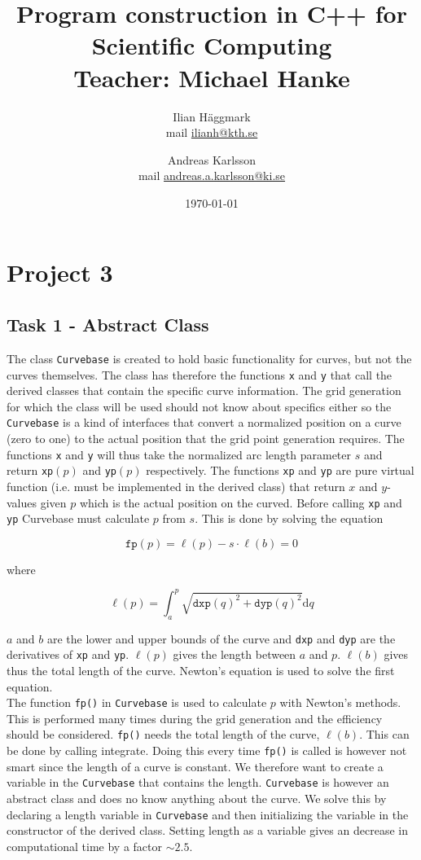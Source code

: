 \documentclass[paper=a4, fontsize=12pt]{article} %
\title{Program construction in C++ for Scientific Computing \\ Teacher: Michael Hanke}
\author{Ilian H{\"a}ggmark \\ mail \href{mailto:ilianh@kth.se}{ilianh@kth.se}
  \and Andreas Karlsson \\ mail \href{mailto:andreas.a.karlsson@ki.se}{andreas.a.karlsson@ki.se} }
\date{\normalsize\today} %
\begin{document}
\maketitle %

\section*{Project 3}
\subsection*{Task 1 - Abstract Class}

The class \texttt{Curvebase} is created to hold basic functionality for curves, but not the curves themselves. The class has therefore the functions \texttt{x} and \texttt{y} that call the derived classes that contain the specific curve information. The grid generation for which the class will be used should not know about specifics either so the \texttt{Curvebase} is a kind of interfaces that convert a normalized position on a curve (zero to one) to the actual position that the grid point generation requires. The functions \texttt{x} and \texttt{y} will thus take the normalized arc length parameter $s$ and return \texttt{xp}$(p)$ and \texttt{yp}$(p)$ respectively. The functions \texttt{xp} and \texttt{yp} are pure virtual function (i.e. must be implemented in the derived class) that return $x$ and $y$-values given $p$ which is the actual position on the curved. Before calling \texttt{xp} and \texttt{yp} Curvebase must calculate $p$ from $s$. This is done by solving the equation 

$$ \texttt{fp}(p) = \ell(p)- s\cdot  \ell(b) = 0 $$

where 

$$ \ell (p) = \int_a^p \sqrt{\texttt{dxp}(q)^2+\texttt{dyp}(q)^2} \textrm{d}q $$

$a$ and $b$ are the lower and upper bounds of the curve and \texttt{dxp} and \texttt{dyp} are the derivatives of \texttt{xp} and \texttt{yp}. $\ell (p)$ gives the length between $a$ and $p$. $\ell (b)$ gives thus the total length of the curve. Newton's equation is used to solve the first equation.\\

The function \texttt{fp()} in \texttt{Curvebase} is used to calculate $p$ with Newton's methods. This is performed many times during the grid generation and the efficiency should be considered. \texttt{fp()} needs the total length of the curve, $\ell (b)$. This can be done by calling integrate. Doing this every time \texttt{fp()} is called is however not smart since the length of a curve is constant. We therefore want to create a variable in the \texttt{Curvebase} that contains the length. \texttt{Curvebase} is however an abstract class and does no know anything about the curve. We solve this by declaring a length variable in \texttt{Curvebase} and then initializing the variable in the constructor of the derived class. Setting length as a variable gives an decrease in computational time by a factor $\sim 2.5$.\\
\end{document}
